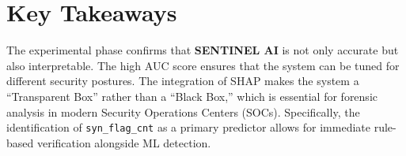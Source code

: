 \section{Key Takeaways}

The experimental phase confirms that \textbf{SENTINEL AI} is not only accurate but also interpretable. The high AUC score ensures that the system can be tuned for different security postures. The integration of SHAP makes the system a ``Transparent Box'' rather than a ``Black Box,'' which is essential for forensic analysis in modern Security Operations Centers (SOCs). Specifically, the identification of \texttt{syn\_flag\_cnt} as a primary predictor allows for immediate rule-based verification alongside ML detection.
